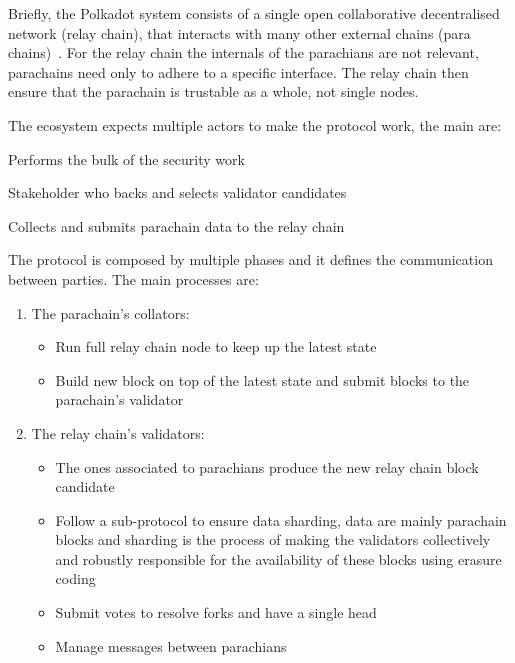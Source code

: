 Briefly, the Polkadot system consists of a single open collaborative decentralised network (relay chain), that interacts with many other external chains (para chains)~\cite{burdges2020overview}. For the relay chain the internals of the parachians are not relevant, parachains need only to adhere to a specific interface. The relay chain then ensure that the parachain is trustable as a whole, not single nodes.

The ecosystem expects multiple actors to make the protocol work, the main are:
\begin{description}[font=$\bullet$ \scshape\bfseries]
  \item[Validator] Performs the bulk of the security work
  \item[Nonimator] Stakeholder who backs and selects validator candidates
  \item[Collator] Collects and submits parachain data to the relay chain
\end{description}

The protocol is composed by multiple phases and it defines the communication between parties. The main processes are:~\cite{burdges2020overview}

\begin{enumerate}
  \item The parachain's collators:
        \begin{itemize}
                \item Run full relay chain node to keep up the latest state
                \item Build new block on top of the latest state and submit blocks to the parachain's validator
        \end{itemize}
  \item The relay chain's validators:
    \begin{itemize}
      \item The ones associated to parachians produce the new relay chain block candidate
      \item Follow a sub-protocol to ensure data sharding, data are mainly parachain blocks and sharding is the process of making the validators collectively and robustly responsible for the availability of these blocks using erasure coding
      \item Submit votes to resolve forks and have a single head
      \item Manage messages between parachians
    \end{itemize}
\end{enumerate}

